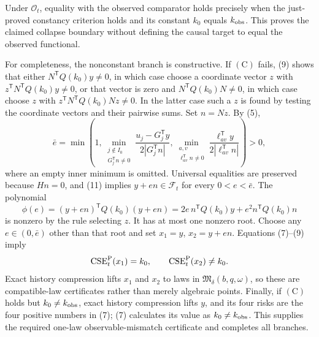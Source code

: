 Under \(\mathcal O_t\), equality with the observed comparator holds precisely when the just-proved constancy criterion holds and its constant \(k_0\) equals \(k_{\rm obs}\).  This proves the claimed collapse boundary without defining the causal target to equal the observed functional.

For completeness, the nonconstant branch is constructive.  If \((\mathrm C)\) fails, (9) shows that either \(N^{\mathsf T}Q(k_0)y\neq0\), in which case choose a coordinate vector \(z\) with
\(z^{\mathsf T}N^{\mathsf T}Q(k_0)y\neq0\), or that vector is zero and \(N^{\mathsf T}Q(k_0)N\neq0\), in which case choose \(z\) with
\(z^{\mathsf T}N^{\mathsf T}Q(k_0)Nz\neq0\).  In the latter case such a \(z\) is found by testing the coordinate vectors and their pairwise sums.  Set \(n=Nz\).  By (5),
\[
 \bar e=\min\left(1,
 \min_{\substack{j\notin I_0\\G_j^{\mathsf T}n\neq0}}
 \frac{u_j-G_j^{\mathsf T}y}{2|G_j^{\mathsf T}n|},
 \min_{\substack{a,v\\\ell_{av}^{\mathsf T}n\neq0}}
 \frac{\ell_{av}^{\mathsf T}y}{2|\ell_{av}^{\mathsf T}n|}
 \right)>0,                                                  \tag{11}
\]
where an empty inner minimum is omitted.  Universal equalities are preserved because \(Hn=0\), and (11) implies \(y+en\in\mathcal F_t\) for every \(0<e<\bar e\).  The polynomial
\[
 \phi(e)=(y+en)^{\mathsf T}Q(k_0)(y+en)
 =2e\,n^{\mathsf T}Q(k_0)y+e^2n^{\mathsf T}Q(k_0)n
\]
is nonzero by the rule selecting \(z\).  It has at most one nonzero root.  Choose any \(e\in(0,\bar e)\) other than that root and set
\(x_1=y\), \(x_2=y+en\).  Equations (7)--(9) imply
\[
 \operatorname{CSE}^{\rm P}_t(x_1)=k_0,
 \qquad \operatorname{CSE}^{\rm P}_t(x_2)\neq k_0.
\]
Exact history compression lifts \(x_1\) and \(x_2\) to laws in \(\mathfrak M_\delta(b,q,\omega)\), so these are compatible-law certificates rather than merely algebraic points.  Finally, if \((\mathrm C)\) holds but \(k_0\neq k_{\rm obs}\), exact history compression lifts \(y\), and its four risks are the four positive numbers in (7); (7) calculates its value as \(k_0\neq k_{\rm obs}\).  This supplies the required one-law observable-mismatch certificate and completes all branches.
